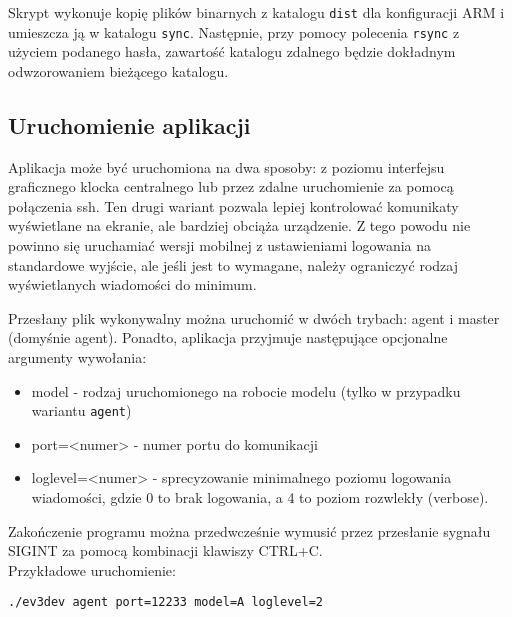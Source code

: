 Skrypt wykonuje kopię plików binarnych z katalogu {\tt dist} dla konfiguracji ARM i umieszcza ją w katalogu {\tt sync}. Następnie, przy pomocy polecenia {\tt rsync} z użyciem podanego hasła, zawartość katalogu zdalnego będzie dokładnym odwzorowaniem bieżącego katalogu.

\subsection{Uruchomienie aplikacji}

Aplikacja może być uruchomiona na dwa sposoby: z poziomu interfejsu graficznego klocka centralnego lub przez zdalne uruchomienie za pomocą połączenia ssh. Ten drugi wariant pozwala lepiej kontrolować komunikaty wyświetlane na ekranie, ale bardziej obciąża urządzenie. Z tego powodu nie powinno się uruchamiać wersji mobilnej z ustawieniami logowania na standardowe wyjście, ale jeśli jest to wymagane, należy ograniczyć rodzaj wyświetlanych wiadomości do minimum.

Przesłany plik wykonywalny można uruchomić w dwóch trybach: agent i master (domyśnie agent). Ponadto, aplikacja przyjmuje następujące opcjonalne argumenty wywołania:
\begin{itemize}
    \item model - rodzaj uruchomionego na robocie modelu (tylko w przypadku wariantu {\tt agent})
    \item port=<numer> - numer portu do komunikacji
    \item loglevel=<numer> - sprecyzowanie minimalnego poziomu logowania wiadomości, gdzie 0 to brak logowania, a 4 to poziom rozwlekły (verbose).
\end{itemize}

Zakończenie programu można przedwcześnie wymusić przez przesłanie sygnału SIGINT za pomocą kombinacji klawiszy CTRL+C.\\


Przykładowe uruchomienie:
\begin{center}
    {\tt ./ev3dev agent port=12233 model=A loglevel=2}
\end{center}
